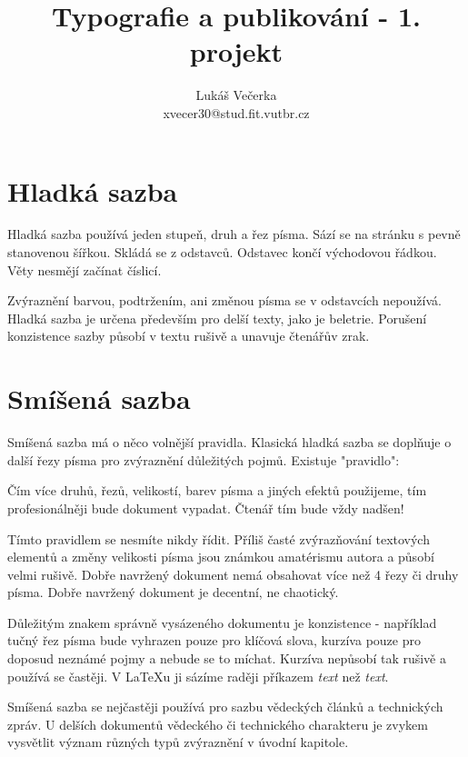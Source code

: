 \documentclass[10pt, a4paper, twocolumn]{article}
\title{Typografie a publikování - 1. projekt}
\author{Lukáš Večerka \\ xvecer30@stud.fit.vutbr.cz}
\date{}
\begin{document}
\maketitle


\section{Hladká sazba}
Hladká sazba používá jeden stupeň, druh a řez písma.
Sází se na stránku s pevně stanovenou šířkou.
Skládá se z odstavců. Odstavec končí východovou řádkou.
Věty nesmějí začínat číslicí.

Zvýraznění barvou, podtržením, ani změnou písma se v odstavcích nepoužívá.
Hladká sazba je určena především pro delší texty, jako je beletrie.
Porušení konzistence sazby působí v textu rušivě a unavuje čtenářův zrak.


\section{Smíšená sazba}

Smíšená sazba má o něco volnější pravidla.
Klasická hladká sazba se doplňuje o další řezy písma pro zvýraznění důležitých pojmů.
Existuje "pravidlo":

Čím více druhů, řezů, velikostí, barev písma a jiných efektů použijeme, tím profesionálněji bude dokument vypadat.
Čtenář tím bude vždy nadšen!

Tímto pravidlem se nesmíte nikdy řídit.
Příliš časté zvýrazňování textových elementů a změny velikosti písma jsou známkou amatérismu autora a působí velmi rušivě.
Dobře navržený dokument nemá obsahovat více než 4 řezy či druhy písma.
Dobře navržený dokument je decentní, ne chaotický.

Důležitým znakem správně vysázeného dokumentu je konzistence - například tučný řez písma bude vyhrazen pouze pro klíčová slova, kurzíva pouze pro doposud neznámé pojmy a nebude se to míchat.
Kurzíva nepůsobí tak rušivě a používá se častěji.
V LaTeXu ji sázíme raději příkazem \emph{text} než \textit{text}.

Smíšená sazba se nejčastěji používá pro sazbu vědeckých článků a technických zpráv.
U delších dokumentů vědeckého či technického charakteru je zvykem vysvětlit význam různých typů zvýraznění v úvodní kapitole.
\end{document}
